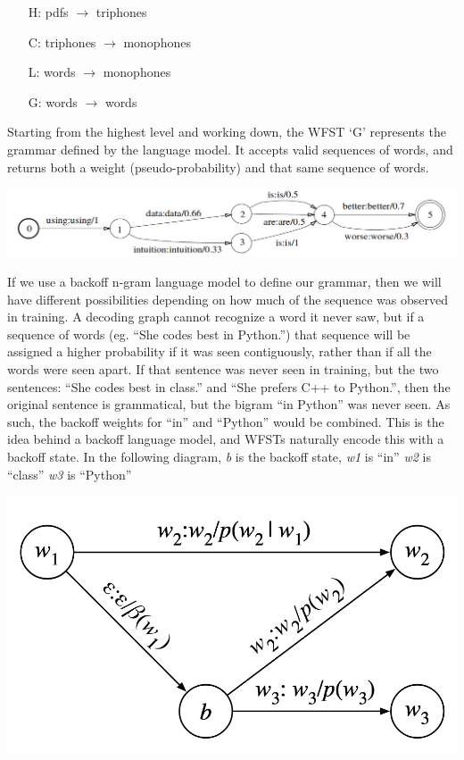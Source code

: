 \documentclass[10pt,a4paper]{article}
\begin{document}
\begin{enumerate}
\item[H:] pdfs $\rightarrow$ triphones
\item[C:] triphones $\rightarrow$ monophones
\item[L:] words $\rightarrow$ monophones
\item[G:] words $\rightarrow$ words
\end{enumerate}


Starting from the highest level and working down, the WFST `G' represents the grammar defined by the language model. It accepts valid sequences of words, and returns both a weight (pseudo-probability) and that same sequence of words.


\begin{center}
  \includegraphics[width=.9\textwidth,keepaspectratio]{figs/mohri-G.png}
\end{center}

If we use a backoff n-gram language model to define our grammar, then we will have different possibilities depending on how much of the sequence was observed in training. A decoding graph cannot recognize a word it never saw, but if a sequence of words (eg. ``She codes best in Python.'') that sequence will be assigned a higher probability if it was seen contiguously, rather than if all the words were seen apart.  If that sentence was never seen in training, but the two sentences: ``She codes best in class.'' and ``She prefers C++ to Python.'', then the original sentence is grammatical, but the bigram ``in Python'' was never seen. As such, the backoff weights for ``in'' and ``Python'' would be combined. This is the idea behind a backoff language model, and WFSTs naturally encode this with a backoff state. In the following diagram, \textit{b} is the backoff state, \textit{w1} is ``in'' \textit{w2} is ``class'' \textit{w3} is ``Python''

\begin{center}
  \includegraphics[width=.6\textwidth,keepaspectratio]{figs/mohri-backoff.png}
\end{center}
\end{document}
